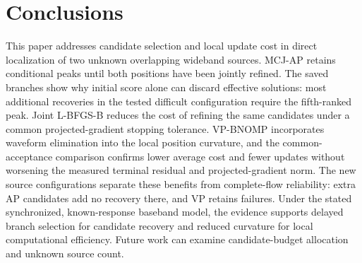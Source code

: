 \documentclass[a4paper,fleqn,review]{cas-sc}
\begin{document}
\FloatBarrier
\section{Conclusions}
This paper addresses candidate selection and local update cost in direct localization of two unknown overlapping wideband sources. MCJ-AP retains conditional peaks until both positions have been jointly refined. The saved branches show why initial score alone can discard effective solutions: most additional recoveries in the tested difficult configuration require the fifth-ranked peak. Joint L-BFGS-B reduces the cost of refining the same candidates under a common projected-gradient stopping tolerance. VP-BNOMP incorporates waveform elimination into the local position curvature, and the common-acceptance comparison confirms lower average cost and fewer updates without worsening the measured terminal residual and projected-gradient norm. The new source configurations separate these benefits from complete-flow reliability: extra AP candidates add no recovery there, and VP retains failures. Under the stated synchronized, known-response baseband model, the evidence supports delayed branch selection for candidate recovery and reduced curvature for local computational efficiency. Future work can examine candidate-budget allocation and unknown source count.

\FloatBarrier
\appendix
\FloatBarrier
\end{document}
